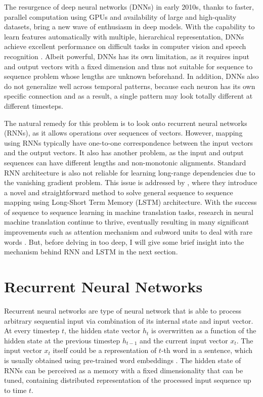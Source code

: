 \documentclass[12pt]{extarticle}
\begin{document}
The resurgence of deep neural networks (DNNs) in early 2010s, thanks to faster, parallel computation using GPUs and availability of large and high-quality datasets, bring a new wave of enthusiasm in deep models. With the capability to learn features automatically with multiple, hierarchical representation, DNNs achieve excellent performance on difficult tasks in computer vision \citep{Krizhevsky:2012:ICD:2999134.2999257} and speech recognition \citep{ASR}. Albeit powerful, DNNs has its own limitation, as it requires input and output vectors with a fixed dimension and thus not suitable for sequence to sequence problem whose lengths are unknown beforehand. In addition, DNNs also do not generalize well across temporal patterns, because each neuron has its own specific connection and as a result, a single pattern may look totally different at different timesteps. 

The natural remedy for this problem is to look onto recurrent neural networks (RNNs), as it allows operations over sequences of vectors. However, mapping using RNNs typically have one-to-one correspondence between the input vectors and the output vectors. It also has another problem, as the input and output sequences can have different lengths and non-monotonic alignments. Standard RNN architecture is also not reliable for learning long-range dependencies due to the vanishing gradient problem. This issue is addressed by \citep{Sutskever:2014:SSL:2969033.2969173} , where they introduce a novel and straightforward method to solve general sequence to sequence mapping using Long-Short Term Memory (LSTM) architecture. With the success of sequence to sequence learning in machine translation tasks, research in neural machine translation continue to thrive, eventually resulting in many significant improvements such as attention mechanism \citep{DBLP:journals/corr/BahdanauCB14} and subword units to deal with rare words \citep{sennrich-etal-2016-neural}. But, before delving in too deep, I will give some brief insight into the mechanism behind RNN and LSTM in the next section. 

\section*{Recurrent Neural Networks} %

Recurrent neural networks \citep{Rumelhart:1986we} are type of neural network that is able to process arbitrary sequential input via combination of its internal state and input vector. At every timestep $t$, the hidden state vector $h_{t}$ is overwritten as a function of the hidden state at the previous timestep $h_{t-1}$ and the current input vector $x_{t}$. The input vector $x_{t}$ itself could be a representation of $t$-th word in a sentence, which is usually obtained using pre-trained word embeddings \citep{DBLP:journals/corr/abs-1301-3781, pennington-etal-2014-glove, Peters:2018}. The hidden state of RNNs can be perceived as a memory with a fixed dimensionality that can be tuned, containing distributed representation of the processed input sequence up to time $t$. 
\end{document}
